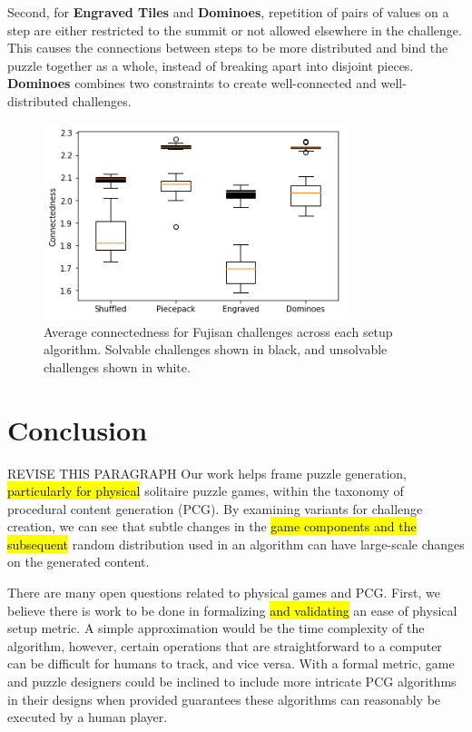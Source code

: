 \documentclass[journal]{IEEEtran}
\begin{document}
Second, for {\bf Engraved Tiles} and {\bf Dominoes}, repetition of pairs of values on a step are either restricted to the summit or not allowed elsewhere in the challenge. This causes the connections between steps to be more distributed and bind the puzzle together as a whole, instead of breaking apart into disjoint pieces. {\bf Dominoes} combines two constraints to create well-connected and well-distributed challenges.

\begin{figure}[t]
\includegraphics[width=8.8cm]{connectedness2.png}
\caption{Average connectedness for Fujisan challenges across each setup algorithm. 
Solvable challenges shown in black, and unsolvable challenges shown in white.}
\label{fig:connected}
\end{figure}



\section{Conclusion}   \label{sec:Conclusion}

\noindent
REVISE THIS PARAGRAPH Our work helps frame puzzle generation, \hl{particularly for physical} solitaire puzzle games, within the taxonomy of procedural content generation (PCG). By examining variants for challenge creation, we can see that subtle changes in the \hl{game components and the subsequent} random distribution used in an algorithm can have large-scale changes on the generated content.

There are many open questions related to physical games and PCG. First, we believe there is work to be done in formalizing \hl{and validating} an ease of physical setup metric. A simple approximation would be the time complexity of the algorithm, however, certain operations that are straightforward to a computer can be difficult for humans to track, and vice versa. With a formal metric, game and puzzle designers could be inclined to include more intricate PCG algorithms in their designs when provided guarantees these algorithms can reasonably be executed by a human player.
\end{document}
